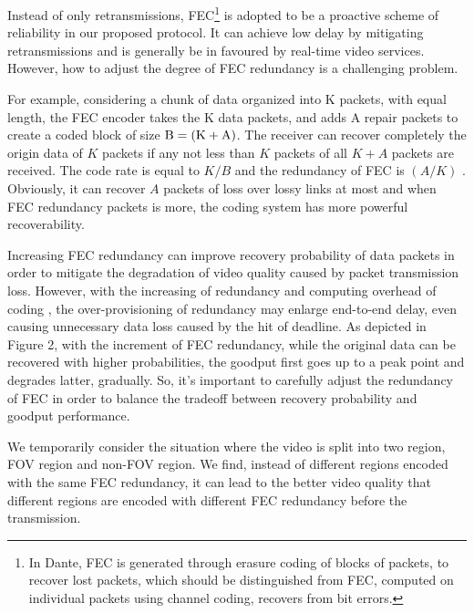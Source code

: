     
	Instead of only retransmissions, FEC\footnote{In Dante, FEC is generated through erasure coding of blocks of packets, to recover lost packets, which should be distinguished from FEC, computed on individual packets using channel coding, recovers from bit errors.} is adopted to be a proactive scheme of reliability in our proposed protocol. It can achieve low delay by mitigating retransmissions and is generally be in favoured by real-time video services. However, how to adjust the degree of FEC redundancy is a challenging problem. 
	 
	For example, considering a chunk of data organized into K packets, with equal length, the FEC encoder takes the K data packets, and adds A repair packets to create a coded block of size ${\rm{B = (K + A)}}$. The receiver can recover completely the origin data of $K$ packets if any not less than $K$ packets of all ${K + A}$ packets are received. The code rate is equal to ${K/B}$ and the redundancy of FEC is ${(A/K)}$ . Obviously, it can recover $A$ packets of loss over lossy links at most and when FEC redundancy packets is more, the coding system has more powerful recoverability. 	 
	
    Increasing FEC redundancy can improve recovery probability of data packets in order to mitigate the degradation of video quality caused by packet transmission loss. However, with the increasing of redundancy and computing overhead of coding \cite{ASCOT}, the over-provisioning of redundancy may enlarge end-to-end delay, even causing unnecessary data loss caused by the hit of deadline. As depicted in Figure 2, with the increment of FEC redundancy, while the original data can be recovered with higher probabilities, the goodput first goes up to a peak point and degrades  latter, gradually. So, it's important to carefully adjust the redundancy of FEC in order to balance the tradeoff between recovery probability and goodput performance.  
	 
	We temporarily consider the situation where the video is split into two region, FOV region and non-FOV region. We find, instead of different regions encoded with the same FEC redundancy, it can lead to the better video quality that different regions are encoded with different FEC redundancy before the transmission. 
	 
